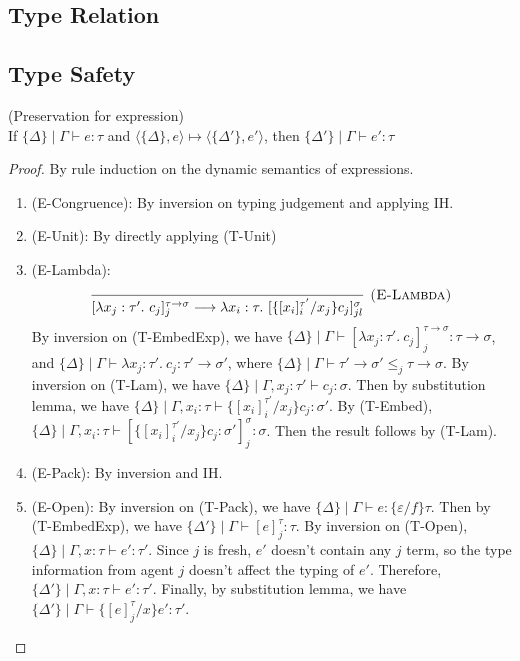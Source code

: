 \subsection{Type Relation}


\subsection{Type Safety}
\begin{lemma} (Preservation for expression)\\
If $\{\Delta\} \mid \Gamma \vdash e : \tau$ and $\langle \{\Delta\}, e\rangle \mapsto \langle \{\Delta'\}, e'\rangle$, then $\{\Delta'\} \mid \Gamma \vdash e' : \tau$
\begin{proof}
By rule induction on the dynamic semantics of expressions. 
\begin{enumerate}
\item (E-Congruence): By inversion on typing judgement and applying IH.
\item (E-Unit): By directly applying (T-Unit)
\item (E-Lambda): 
$$\infer[\textsc{(E-Lambda)}]
  {[\lambda x_j : \tau'.\ c_j]^{\tau \rightarrow \sigma}_{j} \longrightarrow \lambda x_i : \tau.\ [\{[x_i]^{\tau'}_{i}/x_j\}c_j]^\sigma_{jl}}
  {}$$
By inversion on (T-EmbedExp), we have $\{\Delta\} \mid \Gamma \vdash  [\lambda x_j : \tau'.\ c_j]^{\tau \rightarrow \sigma}_{j}: \tau \rightarrow \sigma$, and $\{\Delta\} \mid \Gamma \vdash \lambda x_j : \tau'.\ c_j : \tau' \rightarrow \sigma'$, where $\{\Delta\} \mid \Gamma \vdash \tau' \rightarrow \sigma' \leq_j \tau \rightarrow \sigma$. By inversion on (T-Lam), we have $\{\Delta\} \mid \Gamma, x_j : \tau' \vdash c_j : \sigma$. Then by substitution lemma, we have $\{\Delta\} \mid \Gamma, x_i : \tau  \vdash \{[x_i]^{\tau'}_i/x_j\}c_j : \sigma'$. By (T-Embed), 
$\{\Delta\} \mid \Gamma, x_i : \tau  \vdash [\{[x_i]^{\tau'}_i/x_j\}c_j : \sigma']^{\sigma}_j : \sigma$. Then the result follows by (T-Lam).

\item (E-Pack): By inversion and IH.
\item (E-Open): By inversion on (T-Pack), we have $\{\Delta\} \mid \Gamma \vdash e : \{\varepsilon /f\} \tau$. Then by (T-EmbedExp), we have $\{\Delta'\} \mid \Gamma \vdash [e]^\tau_j : \tau$. By inversion on (T-Open), $\{\Delta\} \mid \Gamma, x : \tau \vdash e' : \tau'$. Since $j$ is fresh, $e'$ doesn't contain any $j$ term, so the type information from agent $j$ doesn't affect the typing of $e'$. Therefore, $\{\Delta'\} \mid \Gamma, x : \tau \vdash e' : \tau'$. Finally, by substitution lemma, we have $\{\Delta'\} \mid \Gamma \vdash \{[e]^\tau_j / x \}e' : \tau'$.


\end{enumerate}
\end{proof}
\end{lemma}
